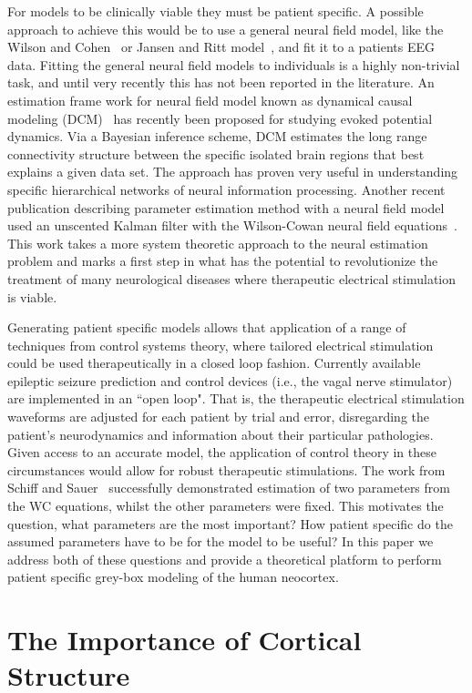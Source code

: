 \documentclass[journal]{IEEEtran}
\begin{document}
For models to be clinically viable they must be patient specific. A possible approach to achieve this would be to use a general neural field model, like the Wilson and Cohen~\cite{Wilson1973} or Jansen and Ritt model~\cite{Jansen1995}, and fit it to a patients EEG data. Fitting the general neural field models to individuals is a highly non-trivial task, and until very recently this has not been reported in the literature. An estimation frame work for neural field model known as dynamical causal modeling (DCM)~\cite{David2003} \cite{David2006} has recently been proposed for studying evoked potential dynamics. Via a Bayesian inference scheme, DCM estimates the long range connectivity structure between the specific isolated brain regions that best explains a given data set. The approach has proven very useful in understanding specific hierarchical networks of neural information processing. Another recent publication describing parameter estimation method with a neural field model used an unscented Kalman filter with the Wilson-Cowan neural field equations~\cite{schiff2008kalman}.  This work takes a more system theoretic approach to the neural estimation problem and marks a first step in what has the potential to revolutionize the treatment of many neurological diseases where therapeutic electrical stimulation is viable.

Generating patient specific models allows that application of a range of techniques from control systems theory, where tailored electrical stimulation could be used therapeutically in a closed loop fashion.  Currently available epileptic seizure prediction and control devices (i.e., the vagal nerve stimulator) are implemented in an ``open loop".  That is, the therapeutic electrical stimulation waveforms are adjusted for each patient by trial and error, disregarding the patient's neurodynamics and information about their particular pathologies. Given access to an accurate model, the application of control theory in these circumstances would allow for robust therapeutic stimulations.
The work from Schiff and Sauer~\cite{schiff2008kalman} successfully demonstrated  estimation of two parameters from the WC equations, whilst the other parameters were fixed. This motivates the question, what parameters are the most important? How patient specific do the assumed parameters have to be for the model to be useful? In this paper we address both of these questions and provide a theoretical platform to perform patient specific grey-box modeling of the human neocortex.

\section{The Importance of Cortical Structure}
\end{document}
